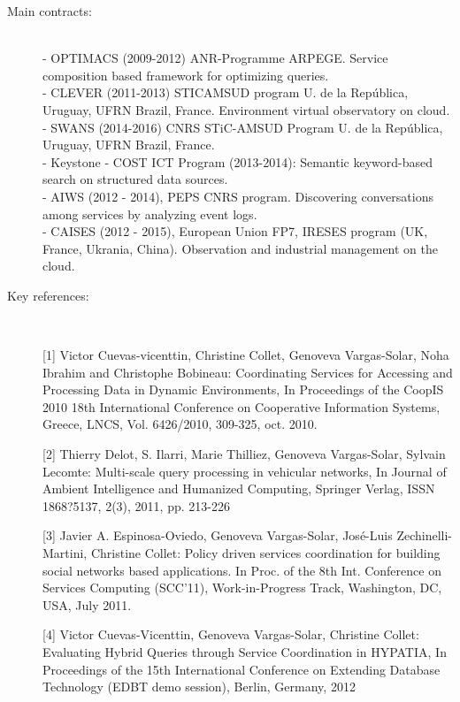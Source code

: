 \begin{description}

\item[Main contracts:] \ \\
- OPTIMACS (2009-2012)	ANR-Programme ARPEGE. Service composition based framework for optimizing queries. \\
- CLEVER (2011-2013) STICAMSUD program  U. de la Rep{\'u}blica, Uruguay, UFRN Brazil, France. Environment virtual observatory on cloud. \\
- SWANS (2014-2016) CNRS STiC-AMSUD Program U. de la Rep{\'u}blica, Uruguay, UFRN Brazil,  France. \\
- Keystone - COST ICT Program (2013-2014): Semantic keyword-based search on structured data sources. \\
- AIWS (2012 - 2014), PEPS  CNRS program. Discovering conversations among services by analyzing event logs.\\
- CAISES (2012 - 2015), European Union FP7, IRESES program (UK, France, Ukrania, China). Observation and industrial management on the cloud.  

\item[Key references:]~%

[1] Victor Cuevas-vicenttin, Christine  Collet, Genoveva Vargas-Solar, Noha  Ibrahim and Christophe Bobineau: Coordinating Services for Accessing and Processing Data in Dynamic Environments, In Proceedings of the CoopIS 2010 18th International Conference on Cooperative Information Systems, Greece, LNCS, Vol. 6426/2010, 309-325, oct. 2010. 

[2] Thierry Delot, S. Ilarri, Marie Thilliez, Genoveva Vargas-Solar, Sylvain Lecomte: Multi-scale query processing in vehicular networks, In Journal of Ambient Intelligence and Humanized Computing, Springer Verlag, ISSN 1868?5137, 2(3), 2011, pp. 213-226

[3] Javier A. Espinosa-Oviedo, Genoveva Vargas-Solar, Jos{\'e}-Luis Zechinelli-Martini, Christine Collet: Policy driven services coordination for building social networks based applications. In Proc. of the 8th Int. Conference on Services Computing (SCC'11), Work-in-Progress Track, Washington, DC, USA, July 2011.

[4] Victor  Cuevas-Vicenttin, Genoveva  Vargas-Solar, Christine Collet: Evaluating Hybrid Queries through Service Coordination in HYPATIA, In Proceedings of the 15th International Conference on Extending Database Technology (EDBT demo session), Berlin, Germany, 2012


\end{description}
